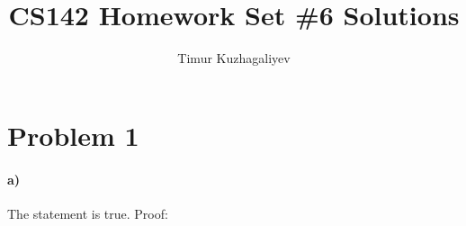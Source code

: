 \documentclass[10pt,letter]{article}
\begin{document}
\title{CS142 Homework Set \#6 Solutions}

\author{Timur Kuzhagaliyev}

 
\maketitle 

\section*{Problem 1}

\paragraph{a)} The statement is true. Proof:
\end{document}
